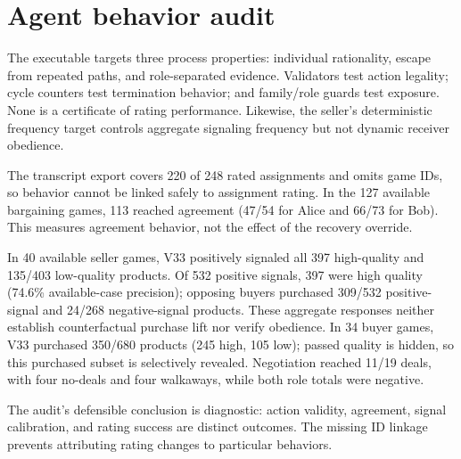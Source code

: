 \section{Agent behavior audit}
\label{sec:behavior}

The executable targets three process properties: individual rationality,
escape from repeated paths, and role-separated evidence. Validators test action
legality; cycle counters test termination behavior; and family/role guards test
exposure. None is a certificate of rating performance. Likewise, the seller's
deterministic frequency target controls aggregate signaling frequency but not
dynamic receiver obedience.

The transcript export covers 220 of 248 rated assignments and omits game IDs,
so behavior cannot be linked safely to assignment rating. In the 127 available
bargaining games, 113 reached agreement (47/54 for Alice and 66/73 for Bob).
This measures agreement behavior, not the effect of the recovery override.

In 40 available seller games, V33 positively signaled all 397 high-quality and
135/403 low-quality products. Of 532 positive signals, 397 were high quality
(74.6\% available-case precision); opposing buyers purchased 309/532 positive-
signal and 24/268 negative-signal products. These aggregate responses neither
establish counterfactual purchase lift nor verify obedience. In 34 buyer games,
V33 purchased 350/680 products (245 high, 105 low); passed quality is hidden, so
this purchased subset is selectively revealed. Negotiation reached 11/19 deals,
with four no-deals and four walkaways, while both role totals were negative.

The audit's defensible conclusion is diagnostic: action validity, agreement,
signal calibration, and rating success are distinct outcomes. The missing ID
linkage prevents attributing rating changes to particular behaviors.
